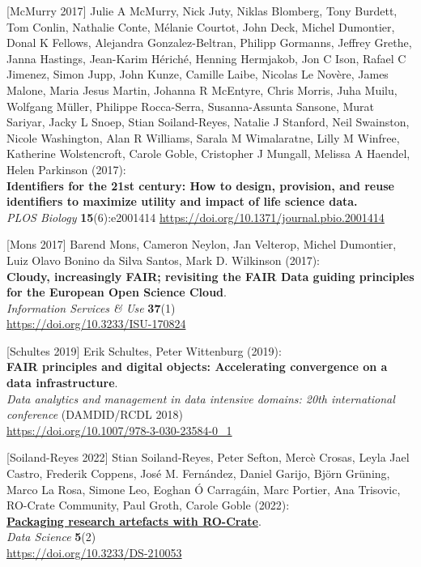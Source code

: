 {[}McMurry 2017{]} Julie A McMurry, Nick Juty, Niklas Blomberg, Tony
Burdett, Tom Conlin, Nathalie Conte, Mélanie Courtot, John Deck, Michel
Dumontier, Donal K Fellows, Alejandra Gonzalez-Beltran, Philipp
Gormanns, Jeffrey Grethe, Janna Hastings, Jean-Karim Hériché, Henning
Hermjakob, Jon C Ison, Rafael C Jimenez, Simon Jupp, John Kunze, Camille
Laibe, Nicolas Le Novère, James Malone, Maria Jesus Martin, Johanna R
McEntyre, Chris Morris, Juha Muilu, Wolfgang Müller, Philippe
Rocca-Serra, Susanna-Assunta Sansone, Murat Sariyar, Jacky L Snoep,
Stian Soiland-Reyes, Natalie J Stanford, Neil Swainston, Nicole
Washington, Alan R Williams, Sarala M Wimalaratne, Lilly M Winfree,
Katherine Wolstencroft, Carole Goble, Cristopher J Mungall, Melissa A
Haendel, Helen Parkinson (2017):\\
\textbf{Identifiers for the 21st century: How to design, provision, and
reuse identifiers to maximize utility and impact of life science
data.}\\
\emph{PLOS Biology} \textbf{15}(6):e2001414
\url{https://doi.org/10.1371/journal.pbio.2001414}

{[}Mons 2017{]} Barend Mons, Cameron Neylon, Jan Velterop, Michel
Dumontier, Luiz Olavo Bonino da Silva Santos, Mark D. Wilkinson
(2017):\\
\textbf{Cloudy, increasingly FAIR; revisiting the FAIR Data guiding
principles for the European Open Science Cloud}.\\
\emph{Information Services \& Use} \textbf{37}(1)\\
\url{https://doi.org/10.3233/ISU-170824}

{[}Schultes 2019{]} Erik Schultes, Peter Wittenburg (2019):\\
\textbf{FAIR principles and digital objects: Accelerating convergence on
a data infrastructure}.\\
\emph{Data analytics and management in data intensive domains: 20th
international conference} (DAMDID/RCDL 2018)\\
\url{https://doi.org/10.1007/978-3-030-23584-0_1}

{[}Soiland-Reyes 2022{]} Stian Soiland-Reyes, Peter Sefton, Mercè
Crosas, Leyla Jael Castro, Frederik Coppens, José M. Fernández, Daniel
Garijo, Björn Grüning, Marco La Rosa, Simone Leo, Eoghan Ó Carragáin,
Marc Portier, Ana Trisovic, RO-Crate Community, Paul Groth, Carole Goble
(2022):\\
\href{../ro-crate/}{\textbf{Packaging research artefacts with
RO-Crate}}.\\
\emph{Data Science} \textbf{5}(2)\\
\url{https://doi.org/10.3233/DS-210053}

